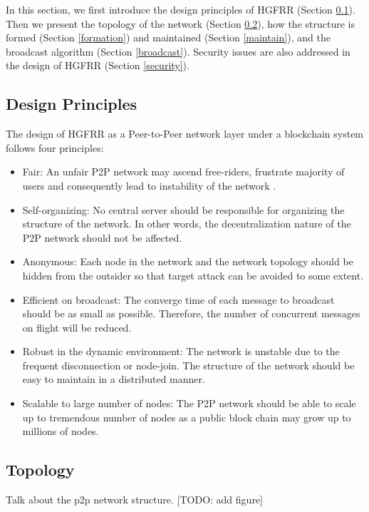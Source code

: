 In this section, we first introduce the design principles of HGFRR (Section \cref{principles}). Then we present the topology of the network (Section \cref{topo}), how the structure is formed (Section \cref{formation}) and maintained (Section \cref{maintain}), and the broadcast algorithm (Section \cref{broadcast}). Security issues are also addressed in the design of HGFRR (Section \cref{security}).

\subsection{Design Principles} \label{principles}

The design of HGFRR as a Peer-to-Peer network layer under a blockchain system follows four principles:
\noindent
\begin{itemize}[noitemsep, topsep=0pt]
	\item Fair: An unfair P2P network may ascend free-riders, frustrate majority of users and consequently lead to instability of the network \cite{naghizadeh2016improving}.
	\item Self-organizing: No central server should be responsible for organizing the structure of the network. In other words, the decentralization nature of the P2P network should not be affected.
	\item Anonymous: Each node in the network and the network topology should be hidden from the outsider so that target attack can be avoided to some extent.
	\item Efficient on broadcast: The converge time of each message to broadcast should be as small as possible. Therefore, the number of concurrent messages on flight will be reduced.
	\item Robust in the dynamic environment: The network is unstable due to the frequent disconnection or node-join. The structure of the network should be easy to maintain in a distributed manner.
	\item Scalable to large number of nodes: The P2P network should be able to scale up to tremendous number of nodes as a public block chain may grow up to millions of nodes.
\end{itemize}

\subsection{Topology} \label{topo}

Talk about the p2p network structure. [TODO: add figure]

